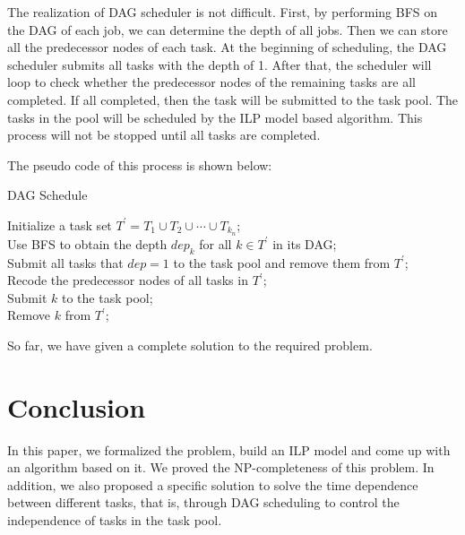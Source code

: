 \documentclass{llncs}
\begin{document}
The realization of DAG scheduler is not difficult. First, by performing BFS on the DAG of each job, we can determine the depth of all jobs. Then we can store all the predecessor nodes of each task. At the beginning of scheduling, the DAG scheduler submits all tasks with the depth of 1. After that, the scheduler will loop to check whether the predecessor nodes of the remaining tasks are all completed. If all completed, then the task will be submitted to the task pool. The tasks in the pool will be scheduled by the ILP model based algorithm. This process will not be stopped until all tasks are completed.

The  pseudo code of this process is shown below:

\begin{minipage}[t]{0.8\textwidth}
    \begin{algorithm}[H]
        \BlankLine
        \caption{DAG Schedule}
        Initialize a task set $ T^{\prime} = T_1 \cup T_2 \cup \cdots \cup T_{k_n} $;\\
        Use BFS to obtain the depth $ dep_k $ for all $ k \in T^{\prime}$ in its DAG;\\
        Submit all tasks that $ dep = 1 $ to the task pool and remove them from $ T^{\prime} $;\\
        Recode the predecessor nodes of all tasks in $ T^{\prime} $;\\
        {
            {
                Submit $ k $ to the task pool;\\
                Remove $ k $ from $ T^{\prime} $;\\
            }
        }
        
    \end{algorithm}
    \end{minipage}


    So far, we have given a complete solution to the required problem.

\section{Conclusion}

In this paper, we formalized the problem, build an ILP model and come up with an algorithm based on it. We proved the NP-completeness of this problem. In addition, we also proposed a specific solution to solve the time dependence between different tasks, that is, through DAG scheduling to control the independence of tasks in the task pool.
\end{document}

